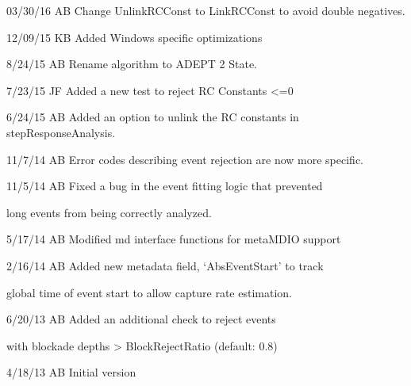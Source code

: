 \documentclass[letterpaper,10pt,english]{sphinxmanual}
\begin{document}
\begin{DUlineblock}{0em}
\item[] 03/30/16        AB      Change UnlinkRCConst to LinkRCConst to avoid double negatives.
\item[] 12/09/15        KB      Added Windows specific optimizations
\item[] 8/24/15         AB      Rename algorithm to ADEPT 2 State.
\item[] 7/23/15         JF  Added a new test to reject RC Constants \textless{}=0
\item[] 6/24/15         AB      Added an option to unlink the RC constants in stepResponseAnalysis.
\item[] 11/7/14         AB      Error codes describing event rejection are now more specific.
\item[] 11/5/14         AB      Fixed a bug in the event fitting logic that prevented
\item[]
\begin{DUlineblock}{\DUlineblockindent}
\item[] long events from being correctly analyzed.
\end{DUlineblock}
\item[] 5/17/14         AB  Modified md interface functions for metaMDIO support
\item[] 2/16/14         AB      Added new metadata field, `AbsEventStart' to track
\item[]
\begin{DUlineblock}{\DUlineblockindent}
\item[] global time of event start to allow capture rate estimation.
\end{DUlineblock}
\item[] 6/20/13         AB      Added an additional check to reject events
\item[]
\begin{DUlineblock}{\DUlineblockindent}
\item[] with blockade depths \textgreater{} BlockRejectRatio (default: 0.8)
\end{DUlineblock}
\item[] 4/18/13         AB      Initial version
\end{DUlineblock}
\end{document}
